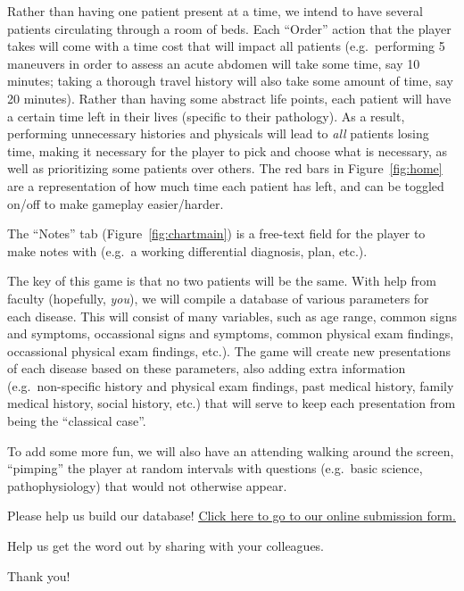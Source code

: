 \documentclass[12pt, twoside]{article}
\begin{document}
	Rather than having one patient present at a time, we intend to have several patients circulating through a room of beds. Each ``Order'' action that the player takes will come with a time cost that will impact all patients (e.g.\ performing 5 maneuvers in order to assess an acute abdomen will take some time, say 10 minutes; taking a thorough travel history will also take some amount of time, say 20 minutes). Rather than having some abstract life points, each patient will have a certain time left in their lives (specific to their pathology). As a result, performing unnecessary histories and physicals will lead to \emph{all} patients losing time, making it necessary for the player to pick and choose what is necessary, as well as prioritizing some patients over others. The red bars in Figure~\ref{fig:home} are a representation of how much time each patient has left, and can be toggled on/off to make gameplay easier/harder.

	The ``Notes'' tab (Figure~\ref{fig:chartmain}) is a free-text field for the player to make notes with (e.g.\ a working differential diagnosis, plan, etc.).

	The key of this game is that no two patients will be the same. With help from faculty (hopefully, \emph{you}), we will compile a database of various parameters for each disease. This will consist of many variables, such as age range, common signs and symptoms, occassional signs and symptoms, common physical exam findings, occassional physical exam findings, etc.). The game will create new presentations of each disease based on these parameters, also adding extra information (e.g.\ non-specific history and physical exam findings, past medical history, family medical history, social history, etc.) that will serve to keep each presentation from being the ``classical case''.

	To add some more fun, we will also have an attending walking around the screen, ``pimping'' the player at random intervals with questions (e.g.\ basic science, pathophysiology) that would not otherwise appear.

	\vspace*{\fill}
	\begin{center}
		\Large
		Please help us build our database! {\color{blue}\underline{\href{https://goo.gl/forms/FWQe1oZEc9khfdRl1}{Click here to go to our online submission form.}}}

		\vspace{24pt}
		Help us get the word out by sharing with your colleagues.

		Thank you!
	\end{center}
	\vspace*{\fill}
\end{document}
